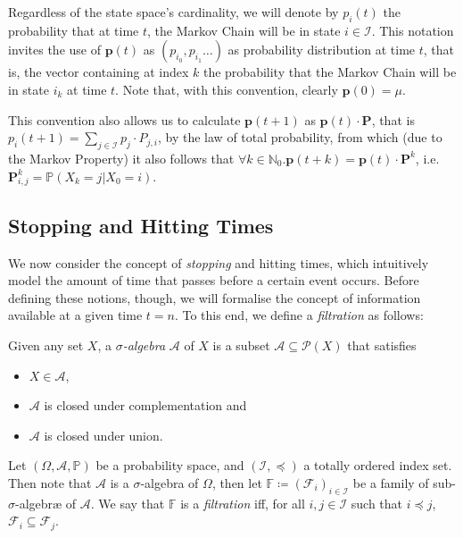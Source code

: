 		Regardless of the state space's cardinality, we will denote by $p_i(t)$ the probability that
		at time $t$, the Markov Chain will be in state $i \in \mathcal{I}$. This notation invites the
		use of $\mathbf{p}(t)$ as $(p_{i_0}, p_{i_1} \hdots)$ as probability distribution at time $t$, 
		that is, the vector containing at index $k$ the probability that the Markov Chain will be in state
		$i_k$ at time $t$. Note that, with this convention, clearly $\mathbf{p}(0) = \mu$.\par 
		This convention also allows us to calculate $\mathbf{p}(t+1)$ as $\mathbf{p}(t) \cdot \mathbf{P}$, 
		that is $p_i(t+1) = \sum_{j \in \mathcal{I}} p_{j} \cdot P_{j,i}$, by the law of total probability,
		from which (due to the Markov Property) it also follows that $\forall k \in \mathbb{N}_0. 
		\mathbf{p}(t+k) = \mathbf{p}(t) \cdot \mathbf{P}^k$, i.e.\ $\mathbf{P}_{i,j}^k = \mathbb{P}(X_k=j
		| X_0 = i)$.


	\subsection{Stopping and Hitting Times}
		We now consider the concept of \emph{stopping} and {hitting times}, which intuitively model the
		amount of time that passes before a certain event occurs. Before defining these notions, though,
		we will formalise the concept of information available at a given time $t = n$. To this end, we 
		define a \emph{filtration} as follows:
		\begin{definition}
			Given any set $X$, a $\sigma$\emph{-algebra} $\mathcal{A}$ of $X$ is a subset $\mathcal{A} 
			\subseteq \mathcal{P}(X)$ that satisfies
			\begin{itemize}
				\item $X \in \mathcal{A}$,
				\item $\mathcal{A}$ is closed under complementation and
				\item $\mathcal{A}$ is closed under union.
			\end{itemize}
		\end{definition}
		\begin{comment}
			We say that, if $\mathcal{A}$ and $\mathcal{B}$ are $\sigma$-algebræ over a set $X$,
			if $\mathcal{B} \subseteq \mathcal{A}$, $\mathcal{B}$ is a 
			\emph{sub-}$\sigma$\emph{-algebra} of $\mathcal{A}$.
		\end{comment}
		\begin{definition}[Filtration]
			Let $(\Omega, \mathcal{A}, \mathbb{P})$ be a probability space, and $(\mathcal{I}, 
			\preceq)$ a totally ordered index set. Then note that $\mathcal{A}$ is a 
			$\sigma$-algebra of $\Omega$, then let $\mathbb{F} \coloneqq (\mathcal{F}_i)_{i \in 
			\mathcal{I}}$ be a family of sub-$\sigma$-algebræ of $\mathcal{A}$. We say that 
			$\mathbb{F}$ is a \emph{filtration} iff, for all $i, j \in \mathcal{I}$ such that $i 
			\preceq j$, $\mathcal{F}_i \subseteq \mathcal{F}_j$.
		\end{definition}


